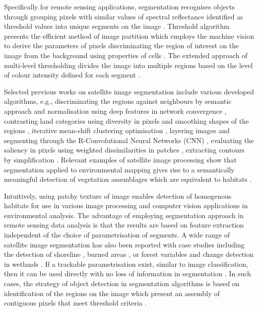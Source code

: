 \documentclass[analytics,article,submit,pdftex,moreauthors]{Definitions/mdpi}
\begin{document}
Specifically for remote sensing applications, segmentation recognises objects through grouping pixels with similar values of spectral reflectance identified as threshold values into unique segments on the image \cite{PAL20229964}. Threshold algorithm presents the efficient method of image partition which employs the machine vision to derive the parameters of pixels discriminating the region of interest on the image from the background using properties of cells \cite{6100288}. The extended approach of multi-level thresholding divides the image into multiple regions based on the level of colour intensity defined for each segment \cite{9244772,5721309,6755644}.

Selected previous works on satellite image segmentation include various developed algorithms, e.g., discriminating the regions against neighbours by semantic approach and normalisation using deep features in network convergence \cite{WANG2023108734}, contrasting land categories using diversity in pixels and smoothing shapes of the regions \cite{MAURYA2023102078}, iterative mean-shift clustering optimisation \cite{6351712}, layering images and segmenting through the R-Convolutional Neural Networks (CNN) \cite{8519391}, evaluating the saliency in pixels using weighted dissimilarities in patches \cite{6727739}, extracting contours by simplification \cite{WU20151133,8630683}. Relevant examples of satellite image processing show that segmentation applied to environmental mapping gives rise to a semantically meaningful detection of vegetation assemblages which are equivalent to habitats \cite{MUNYATI20131}. 

Intuitively, using patchy texture of image enables detection of homogenous habitats for use in various image processing and computer vision applications in environmental analysis. The advantage of employing segmentation approach in remote sensing data analysis is that the results are based on feature extraction independent of the choice of parametrisation of segments. A wide range of satellite image segmentation has also been reported with case studies including the detection of shoreline \cite{ERDEM2021964}, burned areas \cite{KOTARIDIS2023100944,Toulouse}, or forest variables \cite{MAKELA200166} and change detection in wetlands \cite{ZHANG2023129590}. If a trackable parametrisation exist, similar to image classification, then it can be used directly with no loss of information in segmentation \cite{Kharma}. In such cases, the strategy of object detection in segmentation algorithms is based on identification of the regions on the image which present an assembly of contiguous pixels that meet threshold criteria \cite{Aalan,Awad}. 
\end{document}
